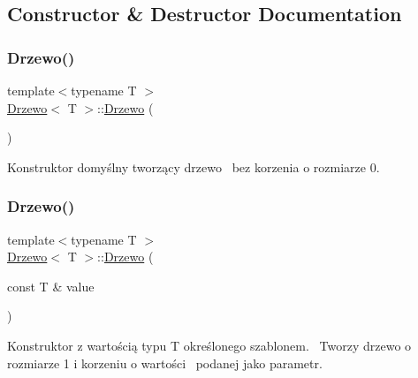 \subsection{Constructor \& Destructor Documentation}
\mbox{\label{class_drzewo_a9b87f8101458fea6c866ffd01efa9ef6}} 
\subsubsection{\texorpdfstring{Drzewo()}{Drzewo()}\hspace{0.1cm}{\footnotesize\ttfamily [1/3]}}
{\footnotesize\ttfamily template$<$typename T $>$ \\
\hyperlink{class_drzewo}{Drzewo}$<$ T $>$\+::\hyperlink{class_drzewo}{Drzewo} (\begin{DoxyParamCaption}{ }\end{DoxyParamCaption})\hspace{0.3cm}{\ttfamily [inline]}}

Konstruktor domyślny tworzący drzewo~\newline
bez korzenia o rozmiarze 0.~\newline
\mbox{\label{class_drzewo_aca8b3e3da416a8e0221c1199ceb579c8}} 
\subsubsection{\texorpdfstring{Drzewo()}{Drzewo()}\hspace{0.1cm}{\footnotesize\ttfamily [2/3]}}
{\footnotesize\ttfamily template$<$typename T $>$ \\
\hyperlink{class_drzewo}{Drzewo}$<$ T $>$\+::\hyperlink{class_drzewo}{Drzewo} (\begin{DoxyParamCaption}\item[{const T \&}]{value }\end{DoxyParamCaption})\hspace{0.3cm}{\ttfamily [inline]}}

Konstruktor z wartością typu T określonego szablonem.~\newline
Tworzy drzewo o rozmiarze 1 i korzeniu o wartości~\newline
podanej jako parametr. \mbox{\label{class_drzewo_a88fdcfad4e56e0053e34d493f656f61f}} 

